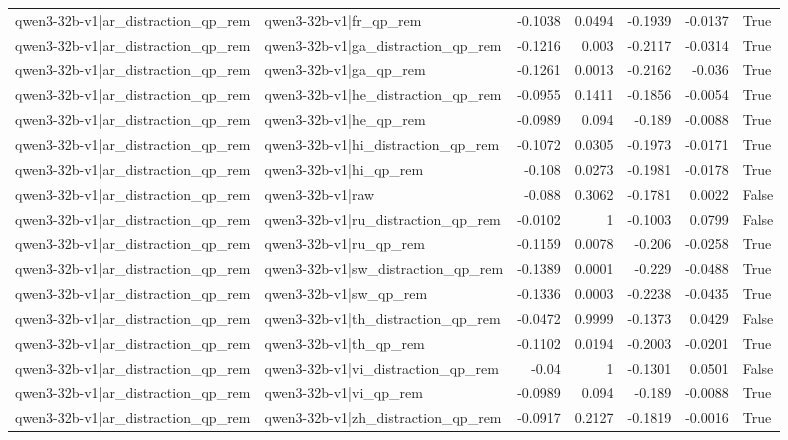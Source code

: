 \begin{table}
\begin{tabular}{l l r r r r l}
qwen3-32b-v1|ar_distraction_qp_rem & qwen3-32b-v1|fr_qp_rem & -0.1038 & 0.0494 & -0.1939 & -0.0137 & True \\
qwen3-32b-v1|ar_distraction_qp_rem & qwen3-32b-v1|ga_distraction_qp_rem & -0.1216 & 0.003 & -0.2117 & -0.0314 & True \\
qwen3-32b-v1|ar_distraction_qp_rem & qwen3-32b-v1|ga_qp_rem & -0.1261 & 0.0013 & -0.2162 & -0.036 & True \\
qwen3-32b-v1|ar_distraction_qp_rem & qwen3-32b-v1|he_distraction_qp_rem & -0.0955 & 0.1411 & -0.1856 & -0.0054 & True \\
qwen3-32b-v1|ar_distraction_qp_rem & qwen3-32b-v1|he_qp_rem & -0.0989 & 0.094 & -0.189 & -0.0088 & True \\
qwen3-32b-v1|ar_distraction_qp_rem & qwen3-32b-v1|hi_distraction_qp_rem & -0.1072 & 0.0305 & -0.1973 & -0.0171 & True \\
qwen3-32b-v1|ar_distraction_qp_rem & qwen3-32b-v1|hi_qp_rem & -0.108 & 0.0273 & -0.1981 & -0.0178 & True \\
qwen3-32b-v1|ar_distraction_qp_rem & qwen3-32b-v1|raw & -0.088 & 0.3062 & -0.1781 & 0.0022 & False \\
qwen3-32b-v1|ar_distraction_qp_rem & qwen3-32b-v1|ru_distraction_qp_rem & -0.0102 & 1 & -0.1003 & 0.0799 & False \\
qwen3-32b-v1|ar_distraction_qp_rem & qwen3-32b-v1|ru_qp_rem & -0.1159 & 0.0078 & -0.206 & -0.0258 & True \\
qwen3-32b-v1|ar_distraction_qp_rem & qwen3-32b-v1|sw_distraction_qp_rem & -0.1389 & 0.0001 & -0.229 & -0.0488 & True \\
qwen3-32b-v1|ar_distraction_qp_rem & qwen3-32b-v1|sw_qp_rem & -0.1336 & 0.0003 & -0.2238 & -0.0435 & True \\
qwen3-32b-v1|ar_distraction_qp_rem & qwen3-32b-v1|th_distraction_qp_rem & -0.0472 & 0.9999 & -0.1373 & 0.0429 & False \\
qwen3-32b-v1|ar_distraction_qp_rem & qwen3-32b-v1|th_qp_rem & -0.1102 & 0.0194 & -0.2003 & -0.0201 & True \\
qwen3-32b-v1|ar_distraction_qp_rem & qwen3-32b-v1|vi_distraction_qp_rem & -0.04 & 1 & -0.1301 & 0.0501 & False \\
qwen3-32b-v1|ar_distraction_qp_rem & qwen3-32b-v1|vi_qp_rem & -0.0989 & 0.094 & -0.189 & -0.0088 & True \\
qwen3-32b-v1|ar_distraction_qp_rem & qwen3-32b-v1|zh_distraction_qp_rem & -0.0917 & 0.2127 & -0.1819 & -0.0016 & True \\

\end{tabular}
\end{table}
